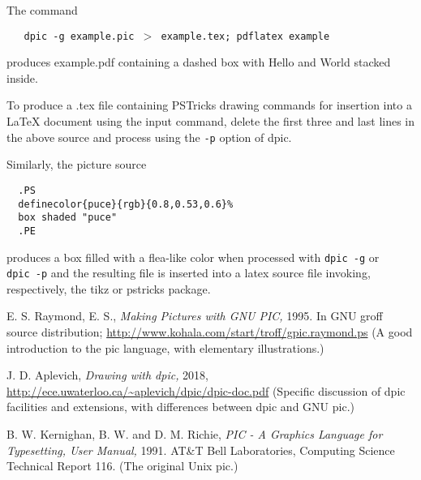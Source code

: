 The command


{\tt \ \ \ dpic\ -g\ example.pic\ $>$\ example.tex;\ pdflatex\ example}

produces example.pdf containing a dashed box with Hello and World
stacked inside.

To produce a .tex file containing PSTricks drawing commands for
insertion into a LaTeX document using the {\tt {}}input command,
delete the first three and last lines in the above source
and process using the
{\tt -p}
option of
dpic.

Similarly, the picture source

{\tt \ \ .PS}
\\\hbox{}\hskip-1pt
{\tt \ \ {\tt {}}definecolor\{puce\}\{rgb\}\{0.8,0.53,0.6\}\%}
\\\hbox{}\hskip-1pt
{\tt \ \ box\ shaded\ {\tt "}puce{\tt "}}
\\\hbox{}\hskip-1pt
{\tt \ \ .PE}

produces a box filled with a flea-like color when processed with
{\tt dpic\ -g}
or
{\tt dpic\ -p}
and the resulting file is inserted into a latex source file invoking,
respectively, the tikz or pstricks package.

E. S. Raymond, E. S.,
{\it Making Pictures with GNU PIC,}
1995.
In GNU groff source distribution;
\url{http://www.kohala.com/start/troff/gpic.raymond.ps}
(A good introduction to the pic language, with elementary
illustrations.)

J. D. Aplevich,
{\it Drawing with dpic,}
2018,
\url{http://ece.uwaterloo.ca/~aplevich/dpic/dpic-doc.pdf}
(Specific discussion of dpic
facilities and extensions, with differences between dpic and GNU pic.)

B. W. Kernighan, B. W. and D. M. Richie,
{\it PIC - A Graphics Language for Typesetting, User Manual,}
1991.
AT\&T Bell Laboratories,
Computing Science Technical Report
116.
(The original Unix
pic.)

